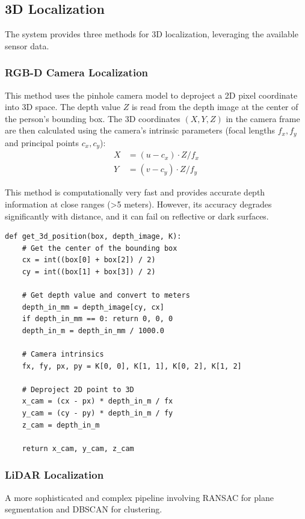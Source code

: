 \documentclass[11pt, a4paper]{article}
\begin{document}
\subsection{3D Localization}
The system provides three methods for 3D localization, leveraging the available sensor data.

\subsubsection{RGB-D Camera Localization}
This method uses the pinhole camera model to deproject a 2D pixel coordinate into 3D space. The depth value $Z$ is read from the depth image at the center of the person's bounding box. The 3D coordinates $(X, Y, Z)$ in the camera frame are then calculated using the camera's intrinsic parameters (focal lengths $f_x, f_y$ and principal points $c_x, c_y$):
\begin{align*}
    X &= (u - c_x) \cdot Z / f_x \\
    Y &= (v - c_y) \cdot Z / f_y
\end{align*}

This method is computationally very fast and provides accurate depth information at close ranges (\textgreater 5 meters). However, its accuracy degrades significantly with distance, and it can fail on reflective or dark surfaces.\\

\begin{lstlisting}[caption={Deprojection logic from `localization.py`.}, label={lst:depth_loc}]
def get_3d_position(box, depth_image, K):
    # Get the center of the bounding box
    cx = int((box[0] + box[2]) / 2)
    cy = int((box[1] + box[3]) / 2)

    # Get depth value and convert to meters
    depth_in_mm = depth_image[cy, cx]
    if depth_in_mm == 0: return 0, 0, 0
    depth_in_m = depth_in_mm / 1000.0

    # Camera intrinsics
    fx, fy, px, py = K[0, 0], K[1, 1], K[0, 2], K[1, 2]

    # Deproject 2D point to 3D
    x_cam = (cx - px) * depth_in_m / fx
    y_cam = (cy - py) * depth_in_m / fy
    z_cam = depth_in_m

    return x_cam, y_cam, z_cam
\end{lstlisting}

\subsubsection{LiDAR Localization}
A more sophisticated and complex pipeline involving RANSAC for plane segmentation and DBSCAN for clustering. \\
\end{document}

